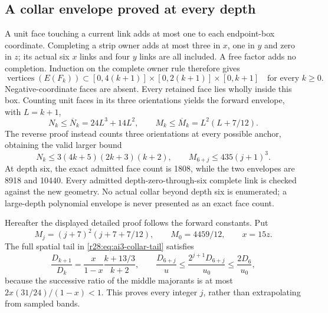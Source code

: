 \subsection{A collar envelope proved at every depth}
A unit face touching a current link adds at most one to each endpoint-box coordinate. Completing a strip owner adds at most three in $x$, one in $y$ and zero in $z$; its actual six $x$ links and four $y$ links are all included. A free factor adds no completion. Induction on the complete owner rule therefore gives
\begin{equation}
 \operatorname{vertices}(E(F_k))\subset
 [0,4(k+1)]\times[0,2(k+1)]\times[0,k+1]
 \quad\text{for every }k\ge0.
 \label{r28:eq:ai4-geometry}
\end{equation}
Negative-coordinate faces are absent. Every retained face lies wholly inside this box. Counting unit faces in its three orientations yields the forward envelope, with $L=k+1$,
\begin{equation}
 N_k\le\overline N_k=24L^3+14L^2,\qquad
 M_k\le\overline M_k=L^2(L+7/12).
 \label{r28:eq:ai4-forward-envelope}
\end{equation}
The reverse proof instead counts three orientations at every possible anchor, obtaining the valid larger bound
\begin{equation}
 N_k\le3(4k+5)(2k+3)(k+2),\qquad
 M_{6+j}\le435(j+1)^3.
 \label{r28:eq:ai4-reverse-envelope}
\end{equation}
At depth six, the exact admitted face count is 1808, while the two envelopes are 8918 and 10440. Every admitted depth-zero-through-six complete link is checked against the new geometry. No actual collar beyond depth six is enumerated; a large-depth polynomial envelope is never presented as an exact face count.

Hereafter the displayed detailed proof follows the forward constants. Put
\begin{equation}
 M_j=(j+7)^2(j+7+7/12),\qquad M_0=4459/12,
 \qquad x=15z.
\end{equation}
The full spatial tail in \eqref{r28:eq:ai3-collar-tail} satisfies
\begin{equation}
 \frac{D_{k+1}}{D_k}=\frac{x}{1-x}\frac{k+13/3}{k+2},\qquad
 \frac{D_{6+j}}u\le\frac{2^{j+1}D_{6+j}}{u_0}
 \le\frac{2D_6}{u_0},
 \label{r28:eq:ai4-spatial-induction}
\end{equation}
because the successive ratio of the middle majorants is at most
$2x(31/24)/(1-x)<1$. This proves every integer $j$, rather than extrapolating from sampled bands.

